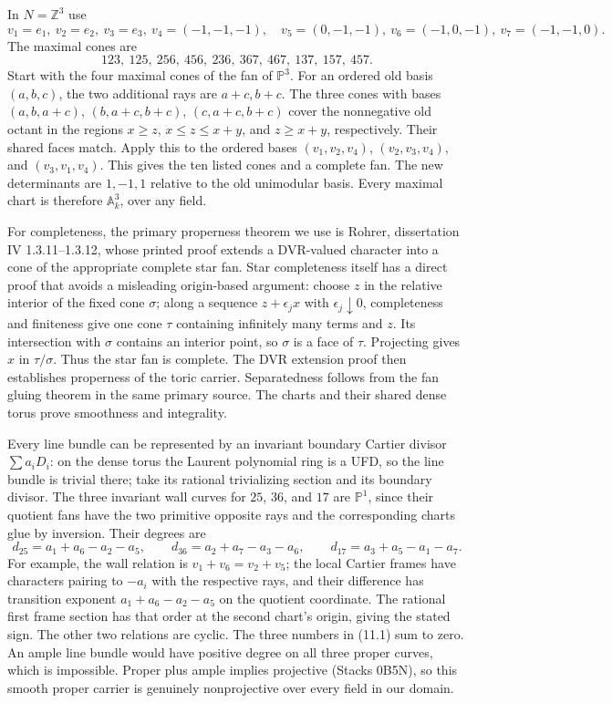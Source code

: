 \documentclass[
  10pt,
]{article}
\begin{document}
In \(N=\mathbb Z^3\) use \[
v_1=e_1,\ v_2=e_2,\ v_3=e_3,\ v_4=(-1,-1,-1),\quad
v_5=(0,-1,-1),\ v_6=(-1,0,-1),\ v_7=(-1,-1,0).
\] The maximal cones are
\[123,\ 125,\ 256,\ 456,\ 236,\ 367,\ 467,\ 137,\ 157,\ 457.\] Start
with the four maximal cones of the fan of \(\mathbb P^3\). For an
ordered old basis \((a,b,c)\), the two additional rays are \(a+c,b+c\).
The three cones with bases \((a,b,a+c)\), \((b,a+c,b+c)\),
\((c,a+c,b+c)\) cover the nonnegative old octant in the regions
\(x\geq z\), \(x\leq z\leq x+y\), and \(z\geq x+y\), respectively. Their
shared faces match. Apply this to the ordered bases \((v_1,v_2,v_4)\),
\((v_2,v_3,v_4)\), and \((v_3,v_1,v_4)\). This gives the ten listed
cones and a complete fan. The new determinants are \(1,-1,1\) relative
to the old unimodular basis. Every maximal chart is therefore
\(\mathbb A^3_k\), over any field.

For completeness, the primary properness theorem we use is Rohrer,
dissertation IV 1.3.11--1.3.12, whose printed proof extends a DVR-valued
character into a cone of the appropriate complete star fan. Star
completeness itself has a direct proof that avoids a misleading
origin-based argument: choose \(z\) in the relative interior of the
fixed cone \(\sigma\); along a sequence \(z+\epsilon_j x\) with
\(\epsilon_j\downarrow0\), completeness and finiteness give one cone
\(\tau\) containing infinitely many terms and \(z\). Its intersection
with \(\sigma\) contains an interior point, so \(\sigma\) is a face of
\(\tau\). Projecting gives \(x\) in \(\tau/\sigma\). Thus the star fan
is complete. The DVR extension proof then establishes properness of the
toric carrier. Separatedness follows from the fan gluing theorem in the
same primary source. The charts and their shared dense torus prove
smoothness and integrality.

Every line bundle can be represented by an invariant boundary Cartier
divisor \(\sum a_iD_i\): on the dense torus the Laurent polynomial ring
is a UFD, so the line bundle is trivial there; take its rational
trivializing section and its boundary divisor. The three invariant wall
curves for \(25\), \(36\), and \(17\) are \(\mathbb P^1\), since their
quotient fans have the two primitive opposite rays and the corresponding
charts glue by inversion. Their degrees are \[
d_{25}=a_1+a_6-a_2-a_5,\qquad
d_{36}=a_2+a_7-a_3-a_6,\qquad
d_{17}=a_3+a_5-a_1-a_7.                                \tag{11.1}
\] For example, the wall relation is \(v_1+v_6=v_2+v_5\); the local
Cartier frames have characters pairing to \(-a_i\) with the respective
rays, and their difference has transition exponent \(a_1+a_6-a_2-a_5\)
on the quotient coordinate. The rational first frame section has that
order at the second chart's origin, giving the stated sign. The other
two relations are cyclic. The three numbers in (11.1) sum to zero. An
ample line bundle would have positive degree on all three proper curves,
which is impossible. Proper plus ample implies projective (Stacks 0B5N),
so this smooth proper carrier is genuinely nonprojective over every
field in our domain.
\end{document}
